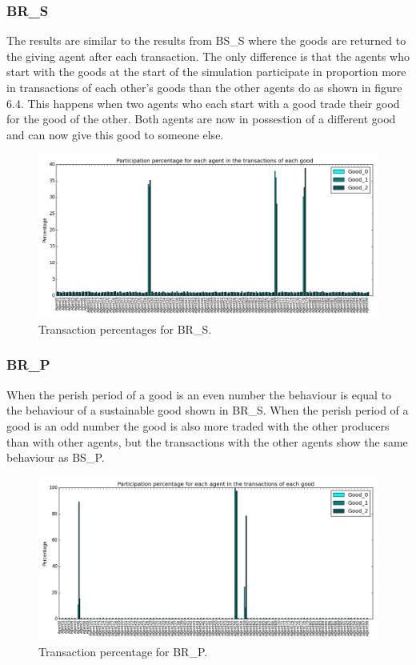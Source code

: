 \documentclass[twoside,openright]{uva-bachelor-thesis}
\begin{document}
\subsubsection{BR\_S} 
The results are similar to the results from BS\_S where the goods are returned to the giving agent after each transaction. The only difference is that the agents who start with the goods at the start of the simulation participate in proportion more in transactions of each other’s goods than the other agents do as shown in figure 6.4. This happens when two agents who each start with a good trade their good for the good of the other. Both agents are now in possestion of a different good and can now give this good to someone else. \\
\begin{figure}[h!]
\centering
\includegraphics[scale=0.4]{Simulation_figures/BR_S/Figure1_30k}
\caption{Transaction percentages for BR\_S.}
\end{figure}
\newpage


\subsubsection{BR\_P}
When the perish period of a good is an even number the behaviour is equal to the behaviour of a sustainable good shown in BR\_S. When the perish period of a good is an odd number the good is also more traded with the other producers than with other agents, but the transactions with the other agents show the same behaviour as BS\_P. 
\begin{figure}[h!]
\centering
\includegraphics[scale=0.4]{Simulation_figures/BR_P/Figure1_10k}
\caption{Transaction percentage for BR\_P.}
\end{figure}
\end{document}
